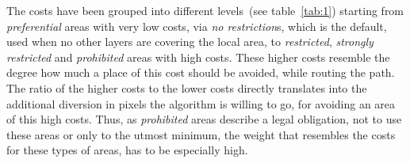 The costs have been grouped into different levels~(see table~\ref{tab:1}) starting from \textit{preferential} areas with
very low costs, via \textit{no restriction}s, which is the default, used when no other layers are covering the local area,
to \textit{restricted}, \textit{strongly restricted} and \textit{prohibited} areas with high costs.
These higher costs resemble the degree how much a place of this cost should be avoided, while routing the path.
The ratio of the higher costs to the lower costs directly translates into the additional diversion in pixels
the algorithm is willing to go, for avoiding an area of this high costs.
Thus, as \textit{prohibited} areas describe a legal obligation, not to use these areas or only to the utmost minimum,
the weight that resembles the costs for these types of areas, has to be especially high.\\

